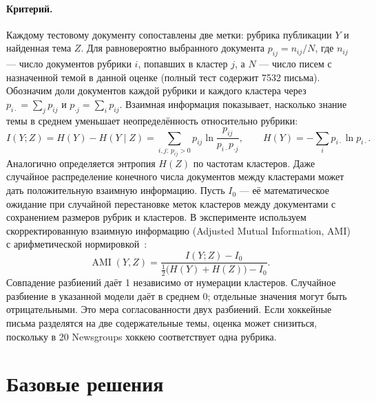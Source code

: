 \documentclass[11pt,a4paper]{article}
\begin{document}
\paragraph{Критерий.} Каждому тестовому документу сопоставлены две метки: рубрика публикации $Y$ и найденная тема $Z$. Для равновероятно выбранного документа $p_{ij}=n_{ij}/N$, где $n_{ij}$ --- число документов рубрики $i$, попавших в кластер $j$, а $N$ --- число писем с назначенной темой в данной оценке (полный тест содержит 7532 письма). Обозначим доли документов каждой рубрики и каждого кластера через $p_{i\cdot}=\sum_j p_{ij}$ и $p_{\cdot j}=\sum_i p_{ij}$. Взаимная информация показывает, насколько знание темы в среднем уменьшает неопределённость относительно рубрики:
\[
 I(Y;Z)=H(Y)-H(Y\mid Z)
 =\sum_{i,j:\,p_{ij}>0}p_{ij}\ln\frac{p_{ij}}{p_{i\cdot}p_{\cdot j}},
 \qquad H(Y)=-\sum_i p_{i\cdot}\ln p_{i\cdot}.
\]
Аналогично определяется энтропия $H(Z)$ по частотам кластеров. Даже случайное распределение конечного числа документов между кластерами может дать положительную взаимную информацию. Пусть $I_0$ --- её математическое ожидание при случайной перестановке меток кластеров между документами с сохранением размеров рубрик и кластеров. В эксперименте используем скорректированную взаимную информацию (Adjusted Mutual Information, AMI) с арифметической нормировкой~\cite{ami}:
\[
 \operatorname{AMI}(Y,Z)=
 \frac{I(Y;Z)-I_0}{\tfrac12\bigl(H(Y)+H(Z)\bigr)-I_0}.
\]
Совпадение разбиений даёт 1 независимо от нумерации кластеров. Случайное разбиение в указанной модели даёт в среднем 0; отдельные значения могут быть отрицательными.  Это мера согласованности двух разбиений. Если хоккейные письма разделятся на две содержательные темы, оценка может снизиться, поскольку в 20 Newsgroups хоккею соответствует одна рубрика.

\section{Базовые решения}
\end{document}
